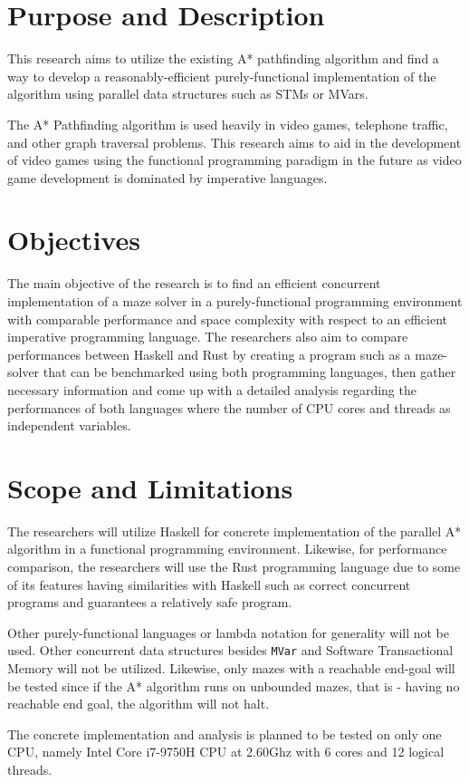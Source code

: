 \section{Purpose and Description}

This research aims to utilize the existing A* pathfinding algorithm
\cite{ZaghloulAlJami2017}\cite{WeinstockHolladay}
and find a way to develop a reasonably-efficient purely-functional 
implementation of the algorithm using parallel data structures such 
as STMs or MVars\cite{Marlow2013}.  

The A* Pathfinding algorithm is used heavily in video games, telephone traffic, 
and other graph traversal problems\cite{HartNilssonRaphael1968}. This research 
aims to aid in the development of video games using the functional 
programming paradigm in the future as video game development is dominated 
by imperative languages.

\section{Objectives}
The main objective of the research is to find an efficient concurrent 
implementation of a maze solver in a purely-functional programming 
environment with comparable performance and space complexity with 
respect to an efficient imperative programming language. The 
researchers also aim to compare performances between Haskell and Rust 
by creating a program such as a maze-solver that can be benchmarked using 
both programming languages, then gather necessary information and come up with a 
detailed analysis regarding the performances of both languages where the number 
of CPU cores and threads as independent variables.


\section{Scope and Limitations}
The researchers will utilize Haskell for concrete implementation 
of the parallel A* algorithm in a functional programming environment.
Likewise, for performance comparison, the researchers 
will use the Rust programming language due to some of its features having
similarities with Haskell such as correct concurrent programs\cite{Saligrama2019}
and guarantees a relatively safe program\cite{Jung2018}.

Other purely-functional languages or lambda notation for generality
will not be used. Other concurrent data structures besides \verb|MVar| and Software
Transactional Memory will not be utilized. Likewise, only mazes with
a reachable end-goal will be tested since if the A* algorithm runs 
on unbounded mazes, that is - having no reachable end goal, the 
algorithm will not halt.\cite{HartNilssonRaphael1968}

The concrete implementation and analysis is planned to be tested on only one CPU, namely
Intel Core i7-9750H CPU at 2.60Ghz with 6 cores and 12 logical threads.